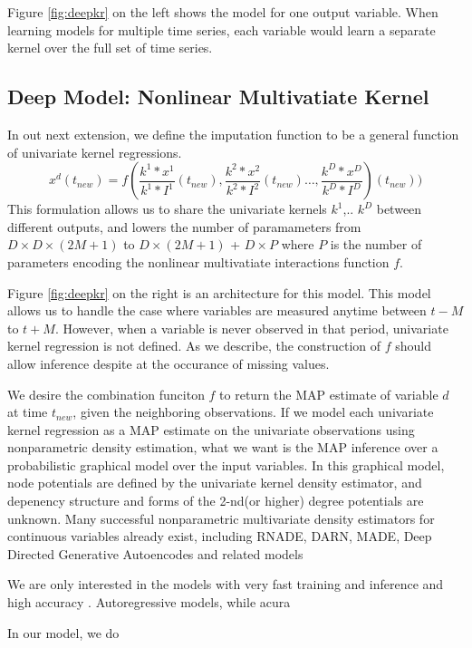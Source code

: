 \documentclass{article} %
\begin{document}
Figure \ref{fig:deepkr} on the left shows the model for one output variable. When learning models for multiple time series, each variable would learn a separate kernel over the full set of time series.

\subsection{Deep Model: Nonlinear Multivatiate Kernel}

In out next extension, we define the imputation function to be a general function of univariate kernel regressions.
$$ x^d(t_{new})=f(\frac{k^1 \ast x^1}{k^1 \ast I^1}(t_{new}), \frac{k^2 \ast x^2}{k^2 \ast I^2}(t_{new})\dots ,\frac{k^D \ast x^D}{k^D \ast I^D})(t_{new}))$$
% 
This formulation allows us to share the univariate kernels $k^1$,.. $k^D$ between different outputs, and lowers the number of paramameters from $D \times D \times (2M+1)$ to $D \times (2M+1)$ + $D \times P$ where $P$ is the number of parameters encoding the nonlinear multivatiate interactions function $f$. 

Figure \ref{fig:deepkr} on the right is an architecture for this model. This model allows us to handle the case where variables are measured anytime between $t-M$ to $t+M$. However, when 
a variable is never observed in that period, univariate kernel regression is not defined. As we describe, the construction of $f$ should allow inference despite at the occurance of missing values. 

We desire the combination funciton $f$ to return the MAP estimate of variable $d$ at time $t_{new}$, given the neighboring observations. If we model each univariate kernel regression as a MAP estimate on the univariate observations using nonparametric density estimation, what we want is the MAP inference over a probabilistic graphical model over the input variables. In this graphical model, node potentials are defined by the univariate kernel density estimator, and depenency structure and forms of the 2-nd(or higher) degree potentials are unknown. 
Many successful nonparametric multivariate density estimators for continuous variables already exist, including RNADE\cite{}, DARN\cite{}, MADE\cite{}, Deep Directed Generative Autoencodes\cite{} and related models \cite{}\cite{}\cite{}

We are only interested in the models with very fast training and inference and high accuracy . Autoregressive models, while acura

In our model, we do 
\end{document}
